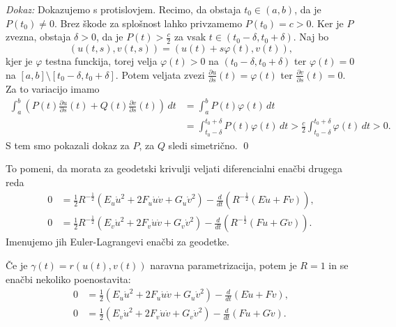 \noindent
{\em Dokaz:\/}
Dokazujemo s protislovjem. Recimo, da obstaja $t_0 \in (a,b)$, da je $P(t_0) \neq 0$. Brez škode za splošnost lahko privzamemo
$P(t_0) = c > 0$. Ker je $P$ zvezna, obstaja $\delta > 0$, da je $P(t) > \frac{c}{2}$ za vsak $t \in (t_0 - \delta, t_0 + \delta)$. 
Naj bo \begin{equation*}
(u(t,s), v(t,s)) = (u(t) + s \varphi(t), v(t)),
\end{equation*}  
kjer je $\varphi$ testna funckija, torej velja $\varphi(t) > 0$ na $(t_0 - \delta, t_0 + \delta)$ ter $\varphi(t) = 0$ na $[a,b] \setminus [t_0 - \delta, t_0 + \delta]$.
Potem veljata zvezi $\frac{ \partial u }{ \partial s }(t)= \varphi(t)$ ter $\frac{ \partial v }{ \partial s }(t) = 0$.
Za to variacijo imamo
\begin{align*}
    \int_{a}^{b} \left(P(t)\frac{ \partial u }{ \partial s } (t) + Q(t)\frac{ \partial v }{ \partial s } (t)  \right) \, dt &= \int_{a}^{b} P(t) \varphi(t) \, dt     \\
     &= \int_{t_0 - \delta}^{t_0 + \delta} P(t) \varphi(t)  \, dt > \frac{c}{2}  \int_{t_0 - \delta}^{t_0 + \delta} \varphi(t) \, dt > 0.
\end{align*} 
S tem smo pokazali dokaz za $P$, za $Q$ sledi simetrično.
\qed

To pomeni, da morata za geodetski krivulji veljati diferencialni enačbi drugega reda \begin{align*}
    0 &= \frac{1}{2} R^{-\frac{1}{2}} (E_u \dot{u}^2 + 2F_u \dot{u} \dot{v} + G_u \dot{v}^2) - \frac{d}{dt} (R^{-\frac{1}{2}}(E\dot{u} + F\dot{v})), \\
    0 &= \frac{1}{2} R^{-\frac{1}{2}} (E_v \dot{u}^2 + 2F_v \dot{u} \dot{v} + G_v \dot{v}^2) - \frac{d}{dt} (R^{-\frac{1}{2}}(F\dot{u} + G\dot{v})).
\end{align*}
Imenujemo jih Euler-Lagrangevi enačbi za geodetke.

\begin{opomba}
Če je $\gamma(t) = r(u(t), v(t))$ naravna parametrizacija, potem je $R = 1$ in se enačbi nekoliko poenostavita:
\begin{align*}
    0 &= \frac{1}{2} (E_u \dot{u}^2 + 2F_u \dot{u} \dot{v} + G_u \dot{v}^2) - \frac{d}{dt} (E\dot{u} + F\dot{v}), \\
    0 &= \frac{1}{2} (E_v \dot{u}^2 + 2F_v \dot{u} \dot{v} + G_v \dot{v}^2) - \frac{d}{dt} (F\dot{u} + G\dot{v}).
\end{align*}
\end{opomba}

